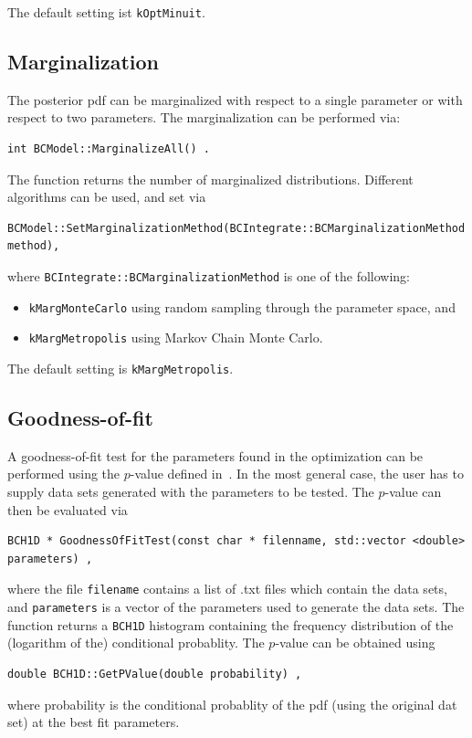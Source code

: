 \documentclass[11pt, a4paper]{article}
\begin{document}
The default setting ist \verb|kOptMinuit|.

\subsection{Marginalization}

The posterior pdf can be marginalized with respect to a single
parameter or with respect to two parameters. The marginalization can
be performed via: 
%
\begin{verbatim}
int BCModel::MarginalizeAll() . 
\end{verbatim}
%
The function returns the number of marginalized
distributions. Different algorithms can be used, and set via
%
\begin{verbatim}
BCModel::SetMarginalizationMethod(BCIntegrate::BCMarginalizationMethod method), 
\end{verbatim}
%
\noindent 
where \verb|BCIntegrate::BCMarginalizationMethod| is one of the
following:
%
\begin{itemize}
\item \verb|kMargMonteCarlo| using random sampling through the parameter space, and
\item \verb|kMargMetropolis| using Markov Chain Monte Carlo. 
\end{itemize}

The default setting is \verb|kMargMetropolis|. 

\subsection{Goodness-of-fit}

A goodness-of-fit test for the parameters found in the optimization
can be performed using the $p$-value defined
in~\cite{Caldwell:2008fw}. In the most general case, the user has to
supply data sets generated with the parameters to be tested. The
$p$-value can then be evaluated via
%
\begin{verbatim}
BCH1D * GoodnessOfFitTest(const char * filenname, std::vector <double> parameters) ,
\end{verbatim}
%
\noindent 
where the file \verb|filename| contains a list of .txt files which
contain the data sets, and \verb|parameters| is a vector of the
parameters used to generate the data sets. The function returns a
\verb|BCH1D| histogram containing the frequency distribution of the
(logarithm of the) conditional probablity. The $p$-value can be
obtained using 
%
\begin{verbatim}
double BCH1D::GetPValue(double probability) , 
\end{verbatim}
%
\noindent
where probability is the conditional probablity of the pdf (using the
original dat set) at the best fit parameters. 
\end{document}
